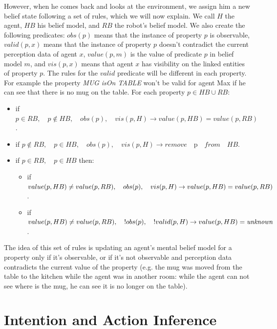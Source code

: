 However, when he comes back and looks at the environment, we assign him a new belief state following a set of rules, which we will now explain. We call $H$ the agent, $HB$ his belief model, and $RB$ the robot's belief model. We also create the following predicates: $obs(p)$ means that the instance of property $p$ is observable, $valid(p,x)$ means that the instance of property $p$ doesn't contradict the current perception data of agent $x$, $value(p,m)$ is the value of predicate $p$ in belief model $m$, and $vis(p,x)$ means that agent $x$ has visibility on the linked entities of property $p$. The rules for the $valid$ predicate will be different in each property. For example the property \textit{MUG isOn TABLE} won't be valid for agent Max if he can see that there is no mug on the table. For each property $p\in HB \cup RB$:
\begin{itemize}
\item if $p \in RB, \quad p\not\in HB,\quad obs(p),\quad vis(p,H) \rightarrow value(p,HB)=value(p,RB)$.
\item if $p \not \in RB,\quad p\in HB,\quad obs(p),\quad vis(p,H) \rightarrow remove\quad $p$ \quad from \quad HB$.
\item if $p\in RB,\quad p\in HB$ then:
	\begin{itemize}
      \item if $value(p,HB)\neq value(p,RB),\\ \quad obs(p),\quad vis(p,H) \rightarrow \\ value(p,HB)=value(p,RB)$.
      \item if $value(p,HB)\neq value(p,RB),\\ \quad !obs(p),\quad !valid(p,H) \rightarrow \\ value(p,HB)=\textit{unknown}$.
	\end{itemize}
\end{itemize}
The idea of this set of rules is updating an agent's mental belief model for a property only if it's observable, or if it's not observable and perception data contradicts the current value of the property (e.g. the mug was moved from the table to the kitchen while the agent was in another room: while the agent can not see where is the mug, he can see it is no longer on the table).



\section{Intention and Action Inference}
\label{sec:situation_assessment-intention_recognition}


